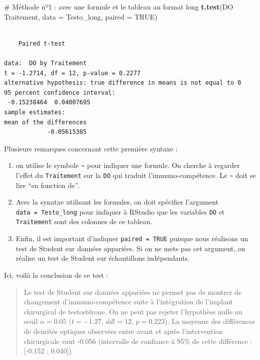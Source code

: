 \documentclass[a4paperpaper,]{article}
\newenvironment{Shaded}{\begin{snugshade}}{\end{snugshade}}
\newcommand{\CommentTok}[1]{\textcolor[rgb]{0.54,0.53,0.53}{#1}}
\newcommand{\DataTypeTok}[1]{\textcolor[rgb]{0.00,0.34,0.68}{#1}}
\newcommand{\KeywordTok}[1]{\textcolor[rgb]{0.12,0.11,0.11}{\textbf{#1}}}
\newcommand{\NormalTok}[1]{\textcolor[rgb]{0.12,0.11,0.11}{#1}}
\newcommand{\OperatorTok}[1]{\textcolor[rgb]{0.12,0.11,0.11}{#1}}
\newcommand{\OtherTok}[1]{\textcolor[rgb]{0.00,0.43,0.16}{#1}}
\newcommand{\StringTok}[1]{\textcolor[rgb]{0.75,0.01,0.01}{#1}}
\providecommand{\tightlist}{%
  \setlength{\itemsep}{0pt}\setlength{\parskip}{0pt}}
\begin{document}
\begin{Shaded}
\begin{Highlighting}[]
\CommentTok{# Méthode nº1 : avec une formule et le tableau au format long}
\KeywordTok{t.test}\NormalTok{(DO }\OperatorTok{~}\StringTok{ }\NormalTok{Traitement, }\DataTypeTok{data =}\NormalTok{ Testo_long, }\DataTypeTok{paired =} \OtherTok{TRUE}\NormalTok{)}
\end{Highlighting}
\end{Shaded}

\begin{verbatim}

    Paired t-test

data:  DO by Traitement
t = -1.2714, df = 12, p-value = 0.2277
alternative hypothesis: true difference in means is not equal to 0
95 percent confidence interval:
 -0.15238464  0.04007695
sample estimates:
mean of the differences 
            -0.05615385 
\end{verbatim}

Plusieurs remarques concernant cette première syntaxe :

\begin{enumerate}
\def\labelenumi{\arabic{enumi}.}
\tightlist
\item
  on utilise le symbole \texttt{\textasciitilde{}} pour indiquer une formule. On cherche à regarder l'effet du \texttt{Traitement} sur la \texttt{DO} qui traduit l'immuno-compétence. Le \texttt{\textasciitilde{}} doit se lire ``en fonction de''.
\item
  Avec la synatxe utilisant les formules, on doit spécifier l'argument \texttt{data\ =\ Testo\_long} pour indiquer à RStudio que les variables \texttt{DO} et \texttt{Traitement} sont des colonnes de ce tableau.
\item
  Enfin, il est important d'indiquer \texttt{paired\ =\ TRUE} puisque nous réalisons un test de Student sur données appariées. Si on ne mets pas cet argument, on réalise un test de Student sur échantillons indépendants.
\end{enumerate}

Ici, voilà la conclusion de ce test :

\begin{quote}
Le test de Student sur données appariées ne permet pas de montrer de changement d'immuno-compétence suite à l'intégration de l'implant chirurgical de testostérone. On ne peut pas rejeter l'hypothèse nulle au seuil \(\alpha = 0.05\) (\(t = -1.27\), \(ddl = 12\), \(p = 0.223\)). La moyenne des différences de densités optiques observées entre avant et après l'intervention chirurgicale vaut -0.056 (intervalle de confiance à 95\% de cette différence : {[}-0.152 ; 0.040{]})
\end{quote}
\end{document}
